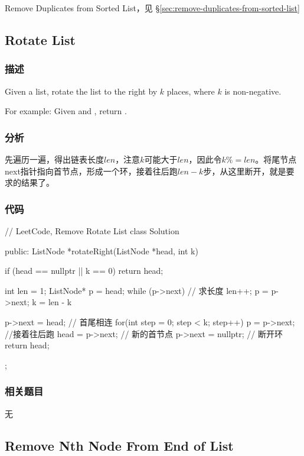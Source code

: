 \begindot
\item Remove Duplicates from Sorted List，见 \S \ref{sec:remove-duplicates-from-sorted-list}
\myenddot


\subsection{Rotate List}
\label{sec:rotate-list}


\subsubsection{描述}
Given a list, rotate the list to the right by $k$ places, where $k$ is non-negative.

For example:
Given  and , return .


\subsubsection{分析}
先遍历一遍，得出链表长度$len$，注意$k$可能大于$len$，因此令$k \%= len$。将尾节点next指针指向首节点，形成一个环，接着往后跑$len-k$步，从这里断开，就是要求的结果了。


\subsubsection{代码}
\begin{Code}
// LeetCode, Remove Rotate List
class Solution {
public:
    ListNode *rotateRight(ListNode *head, int k) {
        if (head == nullptr || k == 0) return head;

        int len = 1;
        ListNode* p = head;
        while (p->next) { // 求长度
            len++;
            p = p->next;
        }
        k = len - k %

        p->next = head; // 首尾相连
        for(int step = 0; step < k; step++) {
            p = p->next;  //接着往后跑
        }
        head = p->next; // 新的首节点
        p->next = nullptr; // 断开环
        return head;
    }
};
\end{Code}


\subsubsection{相关题目}

\begindot
\item 无
\myenddot


\subsection{Remove Nth Node From End of List}
\label{sec:remove-nth-node-from-end-of-list}



